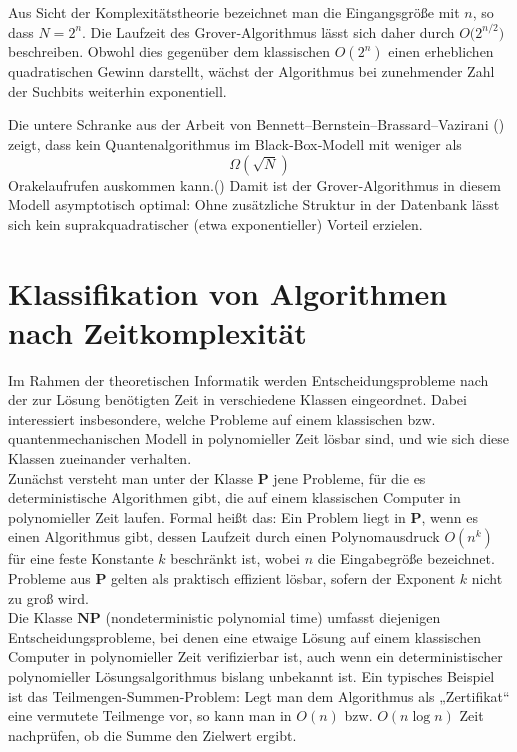 Aus Sicht der Komplexitätstheorie bezeichnet man die Eingangsgröße mit \(n\), so dass $N = 2^n$.
Die Laufzeit des Grover‐Algorithmus lässt sich daher durch  
$O\bigl(2^{n/2}\bigr)$ beschreiben. Obwohl dies gegenüber dem klassischen \(O(2^n)\) einen erheblichen quadratischen Gewinn darstellt, wächst der Algorithmus bei zunehmender Zahl der Suchbits weiterhin exponentiell.

Die untere Schranke aus der Arbeit von Bennett–Bernstein–Brassard–Vazirani (\cite{zotero-1212}) zeigt, dass kein Quantenalgorithmus im Black‐Box‐Modell mit weniger als  
\[
\Omega(\sqrt{N})
\]  
Orakelaufrufen auskommen kann.(\cite{zotero-1211}) Damit ist der Grover‐Algorithmus in diesem Modell asymptotisch optimal: Ohne zusätzliche Struktur in der Datenbank lässt sich kein suprakquadratischer (etwa exponentieller) Vorteil erzielen.  


\section{Klassifikation von Algorithmen nach Zeitkomplexität}

Im Rahmen der theoretischen Informatik werden Entscheidungsprobleme nach der zur Lösung benötigten Zeit in verschiedene Klassen eingeordnet. Dabei interessiert insbesondere, welche Probleme auf einem klassischen bzw. quantenmechanischen Modell in polynomieller Zeit lösbar sind, und wie sich diese Klassen zueinander verhalten.\\

Zunächst versteht man unter der Klasse \(\mathbf{P}\) jene Probleme, für die es deterministische Algorithmen gibt, die auf einem klassischen Computer in polynomieller Zeit laufen. Formal heißt das: Ein Problem liegt in \(\mathbf{P}\), wenn es einen Algorithmus gibt, dessen Laufzeit durch einen Polynomausdruck \(O(n^k)\) für eine feste Konstante \(k\) beschränkt ist, wobei \(n\) die Eingabegröße bezeichnet. Probleme aus \(\mathbf{P}\) gelten als praktisch effizient lösbar, sofern der Exponent \(k\) nicht zu groß wird.\\

Die Klasse \(\mathbf{NP}\) (nondeterministic polynomial time) umfasst diejenigen Entscheidungsprobleme, bei denen eine etwaige Lösung auf einem klassischen Computer in polynomieller Zeit verifizierbar ist, auch wenn ein deterministischer polynomieller Lösungsalgorithmus bislang unbekannt ist. Ein typisches Beispiel ist das Teilmengen-Summen-Problem: Legt man dem Algorithmus als „Zertifikat“ eine vermutete Teilmenge vor, so kann man in \(O(n)\) bzw. \(O(n\log n)\) Zeit nachprüfen, ob die Summe den Zielwert ergibt.\\

